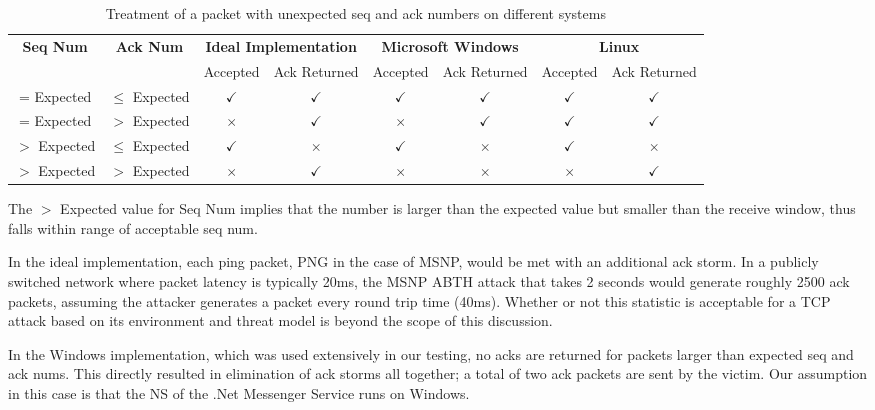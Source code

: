 \documentclass{sig-alternate}
\begin{document}
\begin{table}[tbp]
	\centering

	\caption {Treatment of a packet with unexpected seq and ack numbers on different systems}
	\label{tab:implementations}

	\begin{tabular}{c|c|c|c|c|c|c|c}
		\hline
		\textbf{Seq Num} & \textbf{Ack Num} & \multicolumn{2}{|c|}{\textbf{Ideal Implementation}} & \multicolumn{2}{|c|}{\textbf{Microsoft Windows}} & \multicolumn{2}{|c}{\textbf{Linux}} \\
		& & Accepted & Ack Returned & Accepted & Ack Returned & Accepted & Ack Returned \\
		\hline
		= Expected & $\leq$ Expected & $\checkmark$ & $\checkmark$ & $\checkmark$ & $\checkmark$ & $\checkmark$ & $\checkmark$ \\
		\hline
		= Expected & $>$ Expected & $\times$ & $\checkmark$ & $\times$ & $\checkmark$ & $\checkmark$ & $\checkmark$ \\
		\hline
		$>$ Expected & $\leq$ Expected & $\checkmark$ & $\times$ & $\checkmark$ & $\times$ & $\checkmark$ & $\times$ \\
		\hline
		$>$ Expected & $>$ Expected & $\times$ & $\checkmark$ & $\times$ & $\times$ & $\times$ & $\checkmark$ \\
		\hline
	\end{tabular}

	\begin{flushleft}
		The $>$ Expected value for Seq Num implies that the number is larger than the expected value but smaller than the receive window, thus falls within range of acceptable seq num.
	\end{flushleft}
\end{table}

In the ideal implementation, each ping packet, PNG in the case of MSNP, would be met with an additional ack storm.
In a publicly switched network where packet latency is typically 20ms, the MSNP ABTH attack that takes 2 seconds would generate roughly 2500 ack packets, assuming the attacker generates a packet every round trip time (40ms).
Whether or not this statistic is acceptable for a TCP attack based on its environment and threat model is beyond the scope of this discussion.

In the Windows implementation, which was used extensively in our testing, no acks are returned for packets larger than expected seq and ack nums.
This directly resulted in elimination of ack storms all together; a total of two ack packets are sent by the victim.
Our assumption in this case is that the NS of the .Net Messenger Service runs on Windows.
\end{document}
